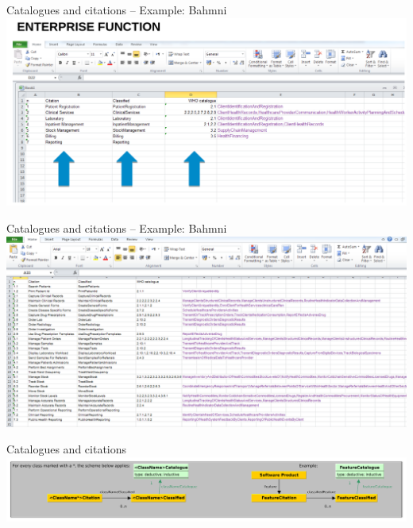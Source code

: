 \documentclass[aspectratio=1610,12pt]{beamer}
\begin{document}
\begin{frame}{Catalogues and citations -- Example: Bahmni}
  \includegraphics[width=\textwidth]{img/bahmni-table1.png}
\end{frame}

\begin{frame}{Catalogues and citations -- Example: Bahmni}
  \includegraphics[width=\textwidth]{img/bahmni-table2.png}
\end{frame}

\begin{frame}{Catalogues and citations}
\centering
\includegraphics[width=\textwidth]{img/excerpt1.pdf}
\end{frame}
\end{document}
